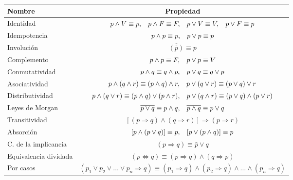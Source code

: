 \begingroup
\setlength{\tabcolsep}{6pt} %
\renewcommand{\arraystretch}{1.5} %
\begin{center}
\begin{tabular}{l|c}
\bf Nombre&\bf Propiedad\\ \hline
Identidad& $p \wedge V \equiv p, \hspace{0.3cm} p \wedge F \equiv F, \hspace{0.3cm} p \vee V \equiv V, \hspace{0.3cm} p \vee F \equiv p  $\\
Idempotencia& $p \wedge p \equiv p,\hspace{0.3cm} p \vee p \equiv p $\\
Involución& $\overline{( {\overline{p}} )} \equiv p$\\
Complemento&$p \wedge \bar{p} \equiv F,\hspace{0.3cm} p \vee \bar{p} \equiv V$\\
Conmutatividad&$ p \wedge q \equiv q \wedge p, \hspace{0.3cm} p \vee q \equiv q \vee p $\\
Asociatividad&$ p \wedge (q \wedge r) \equiv (p \wedge q) \wedge r, \hspace{0.3cm} p \vee (q \vee r) \equiv (p \vee q) \vee r$\\
Distributividad&$p \wedge (q \vee r) \equiv (p \wedge q) \vee (p \wedge r), \hspace{0.3cm}  p \vee (q \wedge r) \equiv (p \vee q) \wedge (p \vee r) $\\
Leyes de Morgan&$\overline{p \vee q} \equiv \bar{p} \wedge \bar{q}, \hspace{0.3cm} \overline{p \wedge q} \equiv \bar{p} \vee \bar{q}$\\
Transitividad&$[(p \Rightarrow q) \wedge (q \Rightarrow r)] \Rightarrow (p \Rightarrow r)$\\
Absorción&$[p \wedge ( p \vee q )] \equiv p, \hspace{0.3cm} [p \vee (p \wedge q)] \equiv p$\\
C. de la implicancia& $(p \Rightarrow q) \equiv \bar{p} \vee q$\\
Equivalencia dividada& $(p \Leftrightarrow q) \equiv (p \Rightarrow q) \wedge (q \Rightarrow p)$\\
Por casos& $(p_1 \vee p_2 \vee \dots \vee p_n \Rightarrow q) \equiv (p_1 \Rightarrow q) \wedge (p_2 \Rightarrow q) \wedge \dots \wedge (p_n \Rightarrow q)$
\end{tabular}

\end{center}
\endgroup
